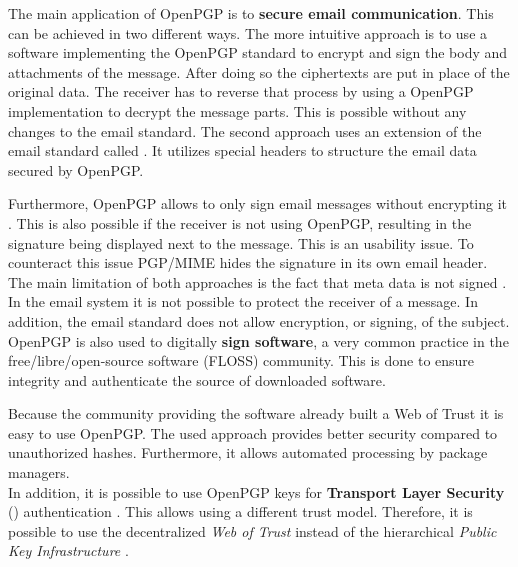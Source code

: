 The main application of OpenPGP is to \textbf{secure email communication}. This can be achieved in two different ways. The more intuitive approach is to use a software implementing the OpenPGP standard to encrypt and sign the body and attachments of the message. After doing so the ciphertexts are put in place of the original data. The receiver has to reverse that process by using a OpenPGP implementation to decrypt the message parts. This is possible without any changes to the email standard. The second approach uses an extension of the email standard called  \citep{RFC3156}. It utilizes special headers to structure the email data secured by OpenPGP.

Furthermore, OpenPGP allows to only sign email messages without encrypting it \cite[section 7]{RFC4880}. This is also possible if the receiver is not using OpenPGP, resulting in the signature being displayed next to the message. This is an usability issue. To counteract this issue PGP/MIME hides the signature in its own email header. \\


The main limitation of both approaches is the fact that meta data is not signed \cite{Green2014}. In the email system it is not possible to protect the receiver of a message. In addition, the email standard does not allow encryption, or signing, of the subject. \\

OpenPGP is also used to digitally \textbf{sign software}, a very common practice in the free/libre/open-source software (FLOSS) community. This is done to ensure integrity and authenticate the source of downloaded software. 

Because the community providing the software already built a Web of Trust it is easy to use OpenPGP. The used approach provides better security compared to unauthorized hashes. Furthermore, it allows automated processing by package managers. \\


In addition, it is possible to use OpenPGP keys for \textbf{Transport Layer Security} () authentication \cite{RFC6091}. This allows using a different trust model. Therefore, it is possible to use the decentralized \textit{Web of Trust} instead of the hierarchical \textit{Public Key Infrastructure} \citep{RFC5280}. 

